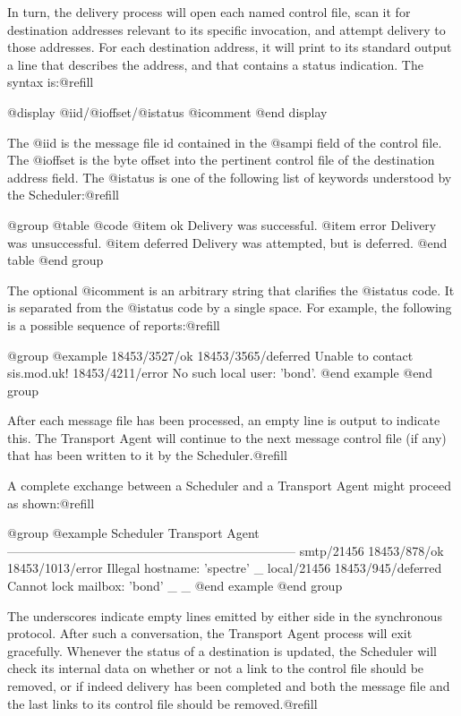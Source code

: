 {{In turn, the delivery process will open each named control file, scan it for
destination addresses relevant to its specific invocation, and attempt
delivery to those addresses.  For each destination address, it will print to
its standard output a line that describes the address, and that contains
a status indication.  The syntax is:@refill

@display
@i{id}/@i{offset}/@i{status} @i{comment}
@end display

The @i{id} is the message file id contained in the @samp{i} field of the
control file.  The @i{offset} is the byte offset into the pertinent control
file of the destination address field.  The @i{status} is one of the
following list of keywords understood by the Scheduler:@refill

@group
@table @code
@item ok
Delivery was successful.
@item error
Delivery was unsuccessful.
@item deferred
Delivery was attempted, but is deferred.
@end table
@end group

The optional @i{comment} is an arbitrary string that clarifies the @i{status}
code.  It is separated from the @i{status} code by a single space.
For example, the following is a possible sequence of reports:@refill

@group
@example
18453/3527/ok
18453/3565/deferred Unable to contact sis.mod.uk!
18453/4211/error No such local user: 'bond'.
@end example
@end group

After each message file has been processed, an empty line is output to
indicate this.  The Transport Agent will continue to the next message control
file (if any) that has been written to it by the Scheduler.@refill

A complete exchange between a Scheduler and a Transport Agent might proceed
as shown:@refill

@group
@example
Scheduler          Transport Agent
---------------------------------------------------------------------
smtp/21456
                   18453/878/ok
                   18453/1013/error Illegal hostname: 'spectre'
                   _
local/21456
                   18453/945/deferred Cannot lock mailbox: 'bond'
                   _
_
@end example
@end group

The underscores indicate empty lines emitted by either side in the
synchronous protocol.  After such a conversation, the Transport Agent process
will exit gracefully.  Whenever the status of a destination is updated, the
Scheduler will check its internal data on whether or not a link to the
control file should be removed, or if indeed delivery has been completed and
both the message file and the last links to its control file should be
removed.@refill

}}
